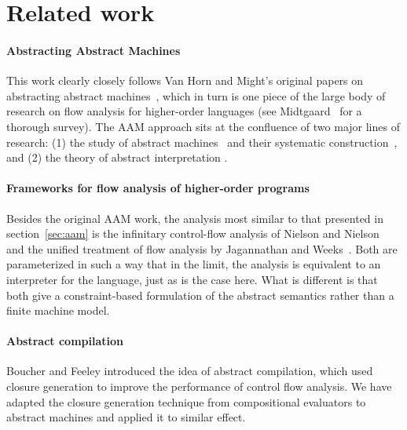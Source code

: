 \documentclass[preprint,onecolumn,9pt]{sigplanconf} %
\begin{document}
\section{Related work}
\label{sec:related}

\paragraph{Abstracting Abstract Machines}

This work clearly closely follows Van Horn and Might's original papers
on abstracting abstract
machines~\cite{dvanhorn:VanHorn2011Abstracting,dvanhorn:VanHorn2012Systematic},
which in turn is one piece of the large body of research on flow
analysis for higher-order languages (see
Midtgaard~\cite{dvanhorn:Midtgaard2011Controlflow} for a thorough
survey).  The AAM approach sits at the confluence of two major lines
of research: (1) the study of abstract
machines~\cite{dvanhorn:landin-64} and their systematic
construction~\cite{dvanhorn:reynolds-hosc98}, and (2) the theory of
abstract interpretation
\cite{dvanhorn:Cousot:1977:AI,dvanhorn:Cousot1979Systematic}.


\paragraph{Frameworks for flow analysis of higher-order programs}

Besides the original AAM work, the analysis most similar to that
presented in section~\ref{sec:aam} is the infinitary control-flow
analysis of Nielson and Nielson~\cite{dvanhorn:nielson-nielson-popl97}
and the unified treatment of flow analysis by Jagannathan and
Weeks~\cite{dvanhorn:jagannathan-weeks-popl95}.  Both are
parameterized in such a way that in the limit, the analysis is
equivalent to an interpreter for the language, just as is the case
here.  What is different is that both give a constraint-based
formulation of the abstract semantics rather than a finite machine
model.

\paragraph{Abstract compilation}

Boucher and Feeley \cite{dvanhorn:Boucher1996Abstract} introduced the
idea of abstract compilation, which used closure generation
\cite{dvanhorn:Feeley1987Using} to improve the performance of control
flow analysis.  We have adapted the closure generation technique from
compositional evaluators to abstract machines and applied it to similar
effect.
\end{document}
